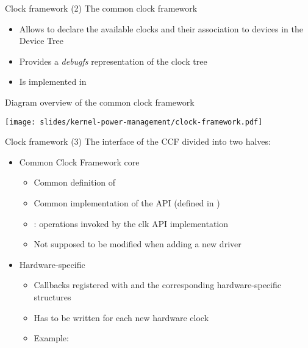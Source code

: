 \begin{frame}{Clock framework (2)}
  The common clock framework
  \begin{itemize}
  \item Allows to declare the available clocks and their association
    to devices in the Device Tree
  \item Provides a {\em debugfs} representation of the clock tree
  \item Is implemented in 
  \end{itemize}
\end{frame}

\begin{frame}{Diagram overview of the common clock framework}
  \begin{center}
    \texttt{[image: slides/kernel-power-management/clock-framework.pdf]}
\end{center}
\end{frame}

\begin{frame}{Clock framework (3)}
  The interface of the CCF divided into two halves:
  \begin{itemize}
  \item Common Clock Framework core
    \begin{itemize}
    \item Common definition of 
    \item Common implementation of the  API (defined in
      )
    \item {}: operations invoked by the clk API
      implementation
    \item Not supposed to be modified when adding a new driver
    \end{itemize}
  \item Hardware-specific
    \begin{itemize}
    \item Callbacks registered with  and the
      corresponding hardware-specific structures
    \item Has to be written for each new hardware clock
    \item Example: 
    \end{itemize}
  \end{itemize}
\end{frame}

